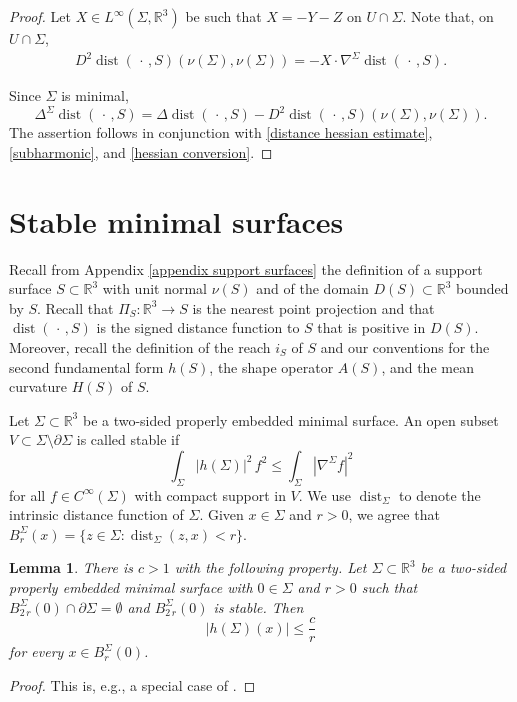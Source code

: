 \documentclass[11pt]{amsart}
\newtheorem{lem}[prop]{Lemma}
\begin{document}
\begin{appendices}
\begin{proof}
		Let  $X\in L^\infty(\Sigma,\mathbb{R}^3)$ be such that  $X=-Y-Z$ on $U\cap \Sigma$. Note that, on $U\cap \Sigma$,
		\begin{align} \label{hessian conversion}
			D^2 \operatorname{dist}(\,\cdot\,,S)(\nu(\Sigma),\nu(\Sigma))=-X\cdot \nabla^\Sigma \operatorname{dist}(\,\cdot\,,S).
		\end{align}
		
		Since $\Sigma$ is minimal, 
			$$
		\Delta^\Sigma \operatorname{dist}(\,\cdot\,,S)=\Delta \operatorname{dist}(\,\cdot\,,S)-D^2 \operatorname{dist}(\,\cdot\,,S)(\nu(\Sigma),\nu(\Sigma)).
		$$
		The assertion follows in conjunction with \eqref{distance hessian estimate}, \eqref{subharmonic}, and \eqref{hessian conversion}.
	\end{proof}

	
		\section{Stable minimal surfaces}
	Recall from Appendix \ref{appendix support surfaces} the definition of a support surface $S\subset \mathbb{R}^3$  with unit normal $\nu(S)$ and of the domain $D(S)\subset \mathbb{R}^3$ bounded by $S$.  Recall that $\Pi_S:\mathbb{R}^3\to S$ is the nearest point projection and that $\operatorname{dist}(\,\cdot\,,S)$ is the signed distance function to $S$ that is positive in $D(S)$. Moreover, recall the definition of the reach $i_S$ of $S$ and our conventions for the second fundamental form $h(S)$, the shape operator $A(S)$, and the mean curvature $H(S)$ of $S$.

		
Let $\Sigma\subset \mathbb{R}^3$ be a  two-sided properly embedded minimal surface. An open subset $V\subset \Sigma\setminus \partial \Sigma$ is called stable if  
$$
\int_\Sigma |h(\Sigma)|^2\,f^2\leq \int_\Sigma |\nabla^\Sigma f|^2
$$  
for all $f\in C^\infty(\Sigma)$ with compact support in $V$. We use $\operatorname{dist}_\Sigma$ to denote the intrinsic distance function of $\Sigma$. Given $x\in \Sigma$ and $r>0$, we agree that $B_r^\Sigma(x)=\{z\in \Sigma:\operatorname{dist}_\Sigma(z,x)<r\}$.
		\begin{lem} \label{lem: stable implies interior curvature estimates}
			There is $c>1$ with the following property. Let $\Sigma \subset \mathbb{R}^3$ be a two-sided properly embedded minimal surface with $0\in \Sigma$ and $r>0$ such that $B^\Sigma_{2\,r}(0)\cap \partial \Sigma=\emptyset$ and  $B^\Sigma_{2\,r}(0)$ is stable. Then 
			$$
			|h(\Sigma)(x)|\leq \frac{c}{r}
			$$ 
			for every $x\in B^\Sigma_{r}(0)$. 
		\end{lem}
		\begin{proof}
		This is, e.g., a special case of \cite[Theorem 2.10]{ColdingMinicozzi}.
		\end{proof}
	

\end{appendices}
\end{document}
